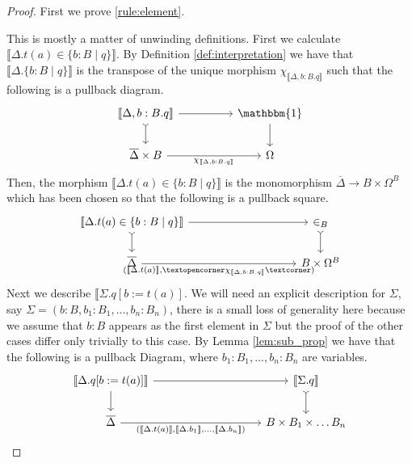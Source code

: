 \documentclass{tac}
\newcommand{\adj}[1]{\text{\textopencorner}{#1}\text{\textcorner}}
\newcommand{\lto}{\longrightarrow}
\begin{document}
	\begin{proof}
		First we prove \eqref{rule:element}.
		
		This is mostly a matter of unwinding definitions. First we calculate $\llbracket \Delta. t(a) \in \lbrace b:B \mid q\rbrace\rrbracket$. By Definition \ref{def:interpretation} we have that $\llbracket \Delta. \lbrace b:B \mid q\rbrace\rrbracket$ is the transpose of the unique morphism $\chi_{\llbracket \Delta,b:B. q\rrbracket}$ such that the following is a pullback diagram.
		\begin{equation}
			\begin{tikzcd}[column sep = huge]
				\llbracket \Delta,b:B. q\rrbracket\arrow[r]\arrow[d,rightarrowtail] & \mathbbm{1}\arrow[d]\\
				\overline{\Delta} \times B\arrow[r,swap,"{\chi_{\llbracket \Delta, b:B. q\rrbracket}}"] & \Omega
			\end{tikzcd}
		\end{equation}
		Then, the morphism $\llbracket \Delta. t(a) \in \lbrace b:B \mid q\rbrace \rrbracket$ is the monomorphism $\overline{\Delta} \lto B \times \Omega^B$ which has been chosen so that the following is a pullback square.
		\begin{equation}
			\begin{tikzcd}[column sep = huge]
				\llbracket \Delta. t(a) \in \lbrace b:B \mid q \rbrace\rrbracket\arrow[rr]\arrow[d,rightarrowtail] & & \in_B\arrow[d,rightarrowtail]\\
				\overline{\Delta}\arrow[rr,swap,"{(\llbracket \Delta. t(a)\rrbracket, \adj{\chi_{\llbracket \Delta,b:B. q\rrbracket}})}"] & & B \times \Omega^B
			\end{tikzcd}
		\end{equation}
		Next we describe $\llbracket \Sigma. q[b:= t(a)]$. We will need an explicit description for $\Sigma$, say $\Sigma = (b:B, b_1:B_1,...,b_n:B_n)$, there is a small loss of generality here because we assume that $b:B$ appears as the first element in $\Sigma$ but the proof of the other cases differ only trivially to this case. By Lemma \ref{lem:sub_prop} we have that the following is a pullback Diagram, where $b_1:B_1,...,b_n:B_n$ are variables.
		\begin{equation}
			\begin{tikzcd}[column sep = huge]
				\llbracket \Delta. q[b:=t(a)]\rrbracket\arrow[rr]\arrow[d] && \llbracket\Sigma. q \rrbracket \arrow[d,rightarrowtail]\\
				\overline{\Delta}\arrow[rr,swap,"{(\llbracket \Delta. t(a)\rrbracket,\llbracket \Delta. b_1\rrbracket,\hdots, \llbracket \Delta. b_n\rrbracket)}"] && B \times B_1 \times \hdots B_n

\end{tikzcd}
\end{equation}
\end{proof}
\end{document}
